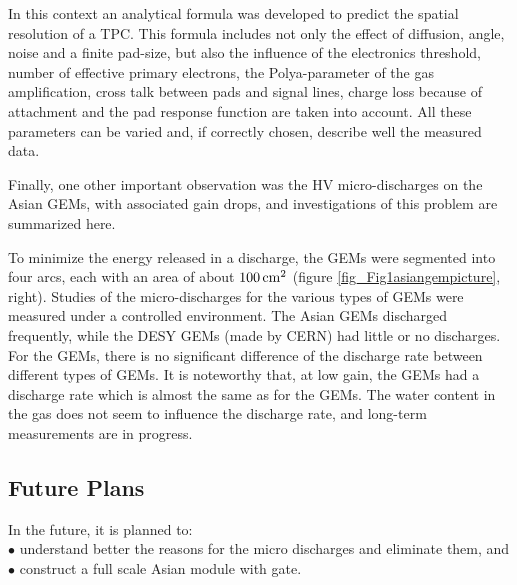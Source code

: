 In this context an analytical formula was developed to predict the spatial resolution of a TPC. This formula includes
not only the effect of diffusion, angle,
noise and a finite pad-size, but also the influence of the electronics threshold, number of effective primary electrons,
the Polya-parameter of the gas
amplification, cross talk between pads and signal lines, charge loss because of attachment and the pad response function
are taken into account. All
these parameters can be varied and, if correctly chosen, describe well the measured data.

Finally, one other important observation was the HV micro-discharges on the Asian GEMs, with associated gain drops,
and investigations of this problem are summarized here.

To minimize the energy released in a discharge, the GEMs were segmented into four arcs, each with an area of
about $\unit[100]{cm^2}$ (figure \ref{fig_Fig1asiangempicture}, right).
Studies of the micro-discharges for the various types of GEMs were measured under a controlled environment.
The \unit[100]{\micron} Asian GEMs discharged frequently, while the DESY \unit[50]{\micron} GEMs (made by CERN) had little or no
discharges. For the \unit[50]{\micron} GEMs, there is no significant difference of
the discharge rate between different types of GEMs. It is noteworthy that, at low gain, the \unit[100]{\micron} GEMs
had a discharge rate which is almost the same as for the \unit[50]{\micron} GEMs. The water content in the gas does not seem to
influence the
discharge rate, and long-term measurements are in progress.


\subsection{Future Plans}

In the future, it is planned to:\\
$\bullet$ understand better the reasons for the micro discharges and eliminate them, and \\
$\bullet$ construct a full scale Asian module with gate.
